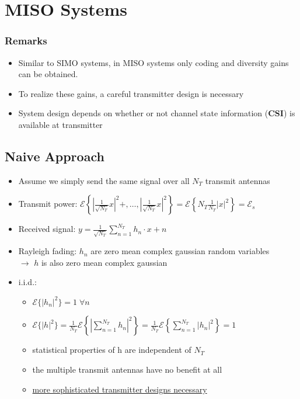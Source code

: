 \documentclass[a4paper, 10pt]{article}
\begin{document}
\section{MISO Systems}
\subsubsection*{Remarks}
	\begin{itemize}
		\item Similar to SIMO systems, in MISO systems only coding and diversity gains can be obtained.
		\item To realize these gains, a careful transmitter design is necessary
		\item System design depends on whether or not channel state information (\textbf{CSI}) is available at transmitter
	\end{itemize}
\subsection{Naive Approach}
\begin{itemize}	
	\item Assume we simply send the same signal over all $N_T$ transmit antennas
\end{itemize}

\begin{itemize}
	\item Transmit power: $\mathcal{E}\left\{\left|\frac{1}{\sqrt{N_T}}x\right|^2+,\dots,\left|\frac{1}{\sqrt{N_T}}x\right|^2\right\}=\mathcal{E}\left\{N_T\frac{1}{N_T}|x|^2\right\}=\mathcal{E}_s$
	\item Received signal: $y=\frac{1}{\sqrt{N_T}}\sum\limits_{n=1}^{N_T}h_n\cdot x+n$
	\item Rayleigh fading: $h_n$ are zero mean complex gaussian random variables\\
	$\rightarrow$ $h$ is also zero mean complex gaussian
	\item i.i.d.:
	\begin{itemize}
		\item $\mathcal{E}\{|h_n|^2\}=1\;\forall n$
		\item $\mathcal{E}\{|h|^2\}=\frac{1}{N_T}\mathcal{E}\left\{\left|\sum\limits_{n=1}^{N_T}h_n\right|^2\right\}=\frac{1}{N_T}\mathcal{E}\left\{\sum\limits^{N_T}_{n=1}|h_n|^2\right\}=1$
		\item statistical properties of h are independent of $N_T$
		\item the multiple transmit antennas have no benefit at all
		\item \underline{more sophisticated transmitter designs necessary}
	\end{itemize}
\end{itemize}
\end{document}
